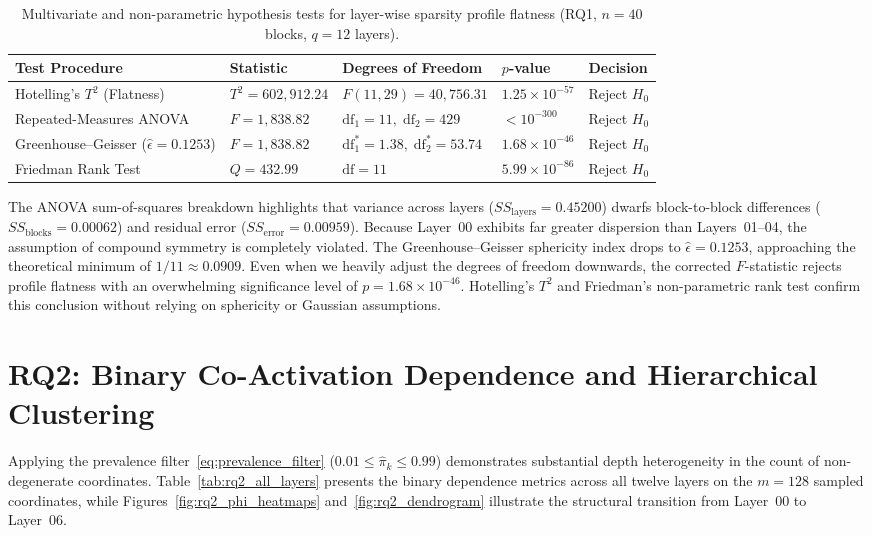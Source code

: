 \documentclass[12pt, a4paper, oneside]{report}
\theoremstyle{definition}
\begin{document}
\begin{table}[htbp]
    \centering
    \caption{Multivariate and non-parametric hypothesis tests for layer-wise sparsity profile flatness (RQ1, $n = 40$ blocks, $q = 12$ layers).}
    \label{tab:rq1_tests}
    \small
    \begin{tabularx}{\textwidth}{@{}l l l l X@{}}
        \toprule
        \textbf{Test Procedure} & \textbf{Statistic} & \textbf{Degrees of Freedom} & \textbf{$p$-value} & \textbf{Decision} \\
        \midrule
        Hotelling's $T^2$ (Flatness) & $T^2 = 602{,}912.24$ & $F(11, 29) = 40{,}756.31$ & $1.25 \times 10^{-57}$ & Reject $H_0$ \\
        Repeated-Measures ANOVA & $F = 1{,}838.82$ & $\mathrm{df}_1 = 11,\; \mathrm{df}_2 = 429$ & $< 10^{-300}$ & Reject $H_0$ \\
        Greenhouse--Geisser ($\hat{\epsilon}=0.1253$) & $F = 1{,}838.82$ & $\mathrm{df}_1^* = 1.38,\; \mathrm{df}_2^* = 53.74$ & $1.68 \times 10^{-46}$ & Reject $H_0$ \\
        Friedman Rank Test & $Q = 432.99$ & $\mathrm{df} = 11$ & $5.99 \times 10^{-86}$ & Reject $H_0$ \\
        \bottomrule
    \end{tabularx}
\end{table}

The ANOVA sum-of-squares breakdown highlights that variance across layers ($SS_{\text{layers}} = 0.45200$) dwarfs block-to-block differences ($SS_{\text{blocks}} = 0.00062$) and residual error ($SS_{\text{error}} = 0.00959$). Because Layer~00 exhibits far greater dispersion than Layers~01--04, the assumption of compound symmetry is completely violated. The Greenhouse--Geisser sphericity index drops to $\hat{\epsilon} = 0.1253$, approaching the theoretical minimum of $1/11 \approx 0.0909$. Even when we heavily adjust the degrees of freedom downwards, the corrected $F$-statistic rejects profile flatness with an overwhelming significance level of $p = 1.68 \times 10^{-46}$. Hotelling's $T^2$ and Friedman's non-parametric rank test confirm this conclusion without relying on sphericity or Gaussian assumptions.

\section{RQ2: Binary Co-Activation Dependence and Hierarchical Clustering}

Applying the prevalence filter~\eqref{eq:prevalence_filter} ($0.01 \le \hat{\pi}_k \le 0.99$) demonstrates substantial depth heterogeneity in the count of non-degenerate coordinates. Table~\ref{tab:rq2_all_layers} presents the binary dependence metrics across all twelve layers on the $m = 128$ sampled coordinates, while Figures~\ref{fig:rq2_phi_heatmaps} and~\ref{fig:rq2_dendrogram} illustrate the structural transition from Layer~00 to Layer~06.
\end{document}
